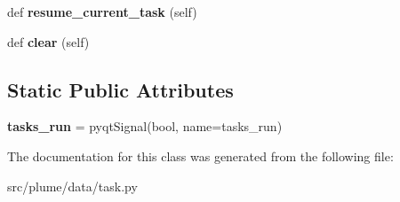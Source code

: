 \begin{DoxyCompactItemize}
\item 
def {\bfseries resume\+\_\+current\+\_\+task} (self)\hypertarget{classplume-creator_1_1src_1_1plume_1_1data_1_1task_1_1_task_manager_a9be6192f0953e5fd7022cddfcbdec6c3}{}\label{classplume-creator_1_1src_1_1plume_1_1data_1_1task_1_1_task_manager_a9be6192f0953e5fd7022cddfcbdec6c3}

\item 
def {\bfseries clear} (self)\hypertarget{classplume-creator_1_1src_1_1plume_1_1data_1_1task_1_1_task_manager_a3e14483ae91eee7dc735780ac96d6278}{}\label{classplume-creator_1_1src_1_1plume_1_1data_1_1task_1_1_task_manager_a3e14483ae91eee7dc735780ac96d6278}

\end{DoxyCompactItemize}
\subsection*{Static Public Attributes}
\begin{DoxyCompactItemize}
\item 
{\bfseries tasks\+\_\+run} = pyqt\+Signal(bool, name=\textquotesingle{}tasks\+\_\+run\textquotesingle{})\hypertarget{classplume-creator_1_1src_1_1plume_1_1data_1_1task_1_1_task_manager_a73796841570083bd09a83a9f17c65c7f}{}\label{classplume-creator_1_1src_1_1plume_1_1data_1_1task_1_1_task_manager_a73796841570083bd09a83a9f17c65c7f}

\end{DoxyCompactItemize}


The documentation for this class was generated from the following file\+:\begin{DoxyCompactItemize}
\item 
src/plume/data/task.\+py\end{DoxyCompactItemize}
